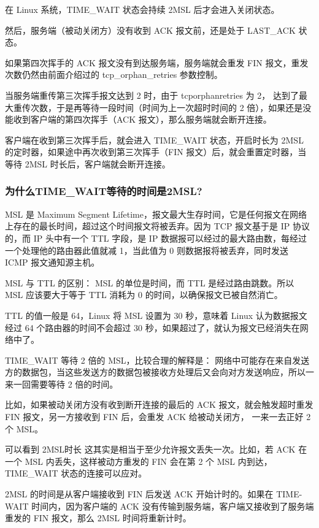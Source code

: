 \documentclass[11pt]{article}
\begin{document}
在 Linux 系统，TIME\_WAIT 状态会持续 2MSL 后才会进入关闭状态。

然后，服务端（被动关闭方）没有收到 ACK 报文前，还是处于 LAST\_ACK 状态。

如果第四次挥手的 ACK 报文没有到达服务端，服务端就会重发 FIN 报文，重发次数仍然由前面介绍过的 tcp\_orphan\_retries 参数控制。

当服务端重传第三次挥手报文达到 2 时，由于 tcporphanretries 为 2， 达到了最大重传次数，于是再等待一段时间（时间为上一次超时时间的 2 倍），如果还是没能收到客户端的第四次挥手（ACK 报文），那么服务端就会断开连接。

客户端在收到第三次挥手后，就会进入 TIME\_WAIT 状态，开启时长为 2MSL 的定时器，如果途中再次收到第三次挥手（FIN 报文）后，就会重置定时器，当等待 2MSL 时长后，客户端就会断开连接。

\subsubsection{为什么TIME\_WAIT等待的时间是2MSL?}
\label{sec:org55fa41b}
MSL 是 Maximum Segment Lifetime，报文最大生存时间，它是任何报文在网络上存在的最长时间，超过这个时间报文将被丢弃。因为 TCP 报文基于是 IP 协议的，而 IP 头中有一个 TTL 字段，是 IP 数据报可以经过的最大路由数，每经过一个处理他的路由器此值就减 1，当此值为 0 则数据报将被丢弃，同时发送 ICMP 报文通知源主机。

MSL 与 TTL 的区别： MSL 的单位是时间，而 TTL 是经过路由跳数。所以 MSL 应该要大于等于 TTL 消耗为 0 的时间，以确保报文已被自然消亡。

TTL 的值一般是 64，Linux 将 MSL 设置为 30 秒，意味着 Linux 认为数据报文经过 64 个路由器的时间不会超过 30 秒，如果超过了，就认为报文已经消失在网络中了。

TIME\_WAIT 等待 2 倍的 MSL，比较合理的解释是： 网络中可能存在来自发送方的数据包，当这些发送方的数据包被接收方处理后又会向对方发送响应，所以一来一回需要等待 2 倍的时间。

比如，如果被动关闭方没有收到断开连接的最后的 ACK 报文，就会触发超时重发 FIN 报文，另一方接收到 FIN 后，会重发 ACK 给被动关闭方， 一来一去正好 2 个 MSL。

可以看到 2MSL时长 这其实是相当于至少允许报文丢失一次。比如，若 ACK 在一个 MSL 内丢失，这样被动方重发的 FIN 会在第 2 个 MSL 内到达，TIME\_WAIT 状态的连接可以应对。

2MSL 的时间是从客户端接收到 FIN 后发送 ACK 开始计时的。如果在 TIME-WAIT 时间内，因为客户端的 ACK 没有传输到服务端，客户端又接收到了服务端重发的 FIN 报文，那么 2MSL 时间将重新计时。
\end{document}
